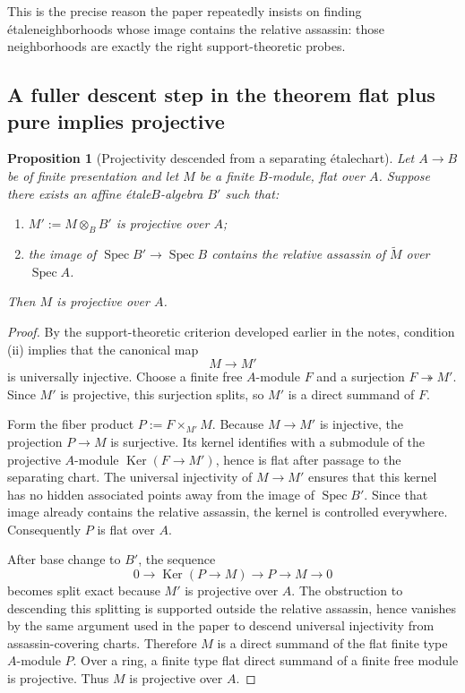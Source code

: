 \documentclass[11pt,oneside]{article}
\newtheorem{proposition}[theorem]{Proposition}
\newcommand{\Spec}{\operatorname{Spec}}
\newcommand{\Ker}{\operatorname{Ker}}
\newcommand{\ot}{\otimes}
\newcommand{\etale}{\'etale}
\begin{document}
This is the precise reason the paper repeatedly insists on finding \etale neighborhoods whose image contains the relative assassin: those neighborhoods are exactly the right support-theoretic probes.

\subsection{A fuller descent step in the theorem flat plus pure implies projective}

\begin{proposition}[Projectivity descended from a separating \etale chart]\label{prop:projectivity-descent}
Let $A\to B$ be of finite presentation and let $M$ be a finite $B$-module, flat over $A$.  Suppose there exists an affine \etale $B$-algebra $B'$ such that:
\begin{enumerate}[label=\textup{(\roman*)}]
  \item $M':=M\ot_B B'$ is projective over $A$;
  \item the image of $\Spec B'\to \Spec B$ contains the relative assassin of $\widetilde M$ over $\Spec A$.
\end{enumerate}
Then $M$ is projective over $A$.
\end{proposition}

\begin{proof}
By the support-theoretic criterion developed earlier in the notes, condition (ii) implies that the canonical map
\[
M\longrightarrow M'
\]
is universally injective.  Choose a finite free $A$-module $F$ and a surjection $F\twoheadrightarrow M'$.  Since $M'$ is projective, this surjection splits, so $M'$ is a direct summand of $F$.

Form the fiber product $P:=F\times_{M'} M$.  Because $M\to M'$ is injective, the projection $P\to M$ is surjective.  Its kernel identifies with a submodule of the projective $A$-module $\Ker(F\to M')$, hence is flat after passage to the separating chart.  The universal injectivity of $M\to M'$ ensures that this kernel has no hidden associated points away from the image of $\Spec B'$.  Since that image already contains the relative assassin, the kernel is controlled everywhere.  Consequently $P$ is flat over $A$.

After base change to $B'$, the sequence
\[
0\to \Ker(P\to M)\to P\to M\to 0
\]
becomes split exact because $M'$ is projective over $A$.  The obstruction to descending this splitting is supported outside the relative assassin, hence vanishes by the same argument used in the paper to descend universal injectivity from assassin-covering charts.  Therefore $M$ is a direct summand of the flat finite type $A$-module $P$.  Over a ring, a finite type flat direct summand of a finite free module is projective.  Thus $M$ is projective over $A$.
\end{proof}
\end{document}
